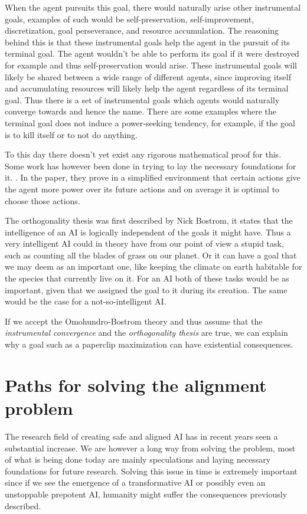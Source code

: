 \documentclass[12pt,A4]{report}
\theoremstyle{definition}
\begin{document}
When the agent pursuits this goal, there would naturally arise other instrumental goals, examples of such would be self-preservation, self-improvement, discretization, goal perseverance, and resource accumulation. The reasoning behind this is that these instrumental goals help the agent in the pursuit of its terminal goal. The agent wouldn't be able to perform its goal if it were destroyed for example and thus self-preservation would arise. These instrumental goals will likely be shared between a wide range of different agents, since improving itself and accumulating resources will likely help the agent regardless of its terminal goal. Thus there is a set of instrumental goals which agents would naturally converge towards and hence the name. There are some examples where the terminal goal does not induce a power-seeking tendency, for example, if the goal is to kill itself or to not do anything. 

To this day there doesn't yet exist any rigorous mathematical proof for this. Some work has however been done in trying to lay the necessary foundations for it. \autocite{TURNER et al}. In the paper, they prove in a simplified environment that certain actions give the agent more power over its future actions and on average it is optimal to choose those actions. 

The orthogonality thesis was first described by Nick Bostrom\cite{Bostrom2}, it states that the intelligence of an AI is logically independent of the goals it might have. Thus a very intelligent AI could in theory have from our point of view a stupid task, such as counting all the blades of grass on our planet. Or it can have a goal that we may deem as an important one, like keeping the climate on earth habitable for the species that currently live on it. For an AI both of these tasks would be as important, given that we assigned the goal to it during its creation. The same would be the case for a not-so-intelligent AI.

If we accept the Omohundro-Bostrom theory and thus assume that the \textit{instrumental convergence} and the \textit{orthogonality thesis} are true, we can explain why a goal such as a paperclip maximization can have existential consequences. 


\section{Paths for solving the alignment problem}
The research field of creating safe and aligned AI has in recent years seen a substantial increase. We are however a long way from solving the problem, most of what is being done today are mainly speculations and laying necessary foundations for future research. Solving this issue in time is extremely important since if we see the emergence of a transformative AI or possibly even an unstoppable prepotent AI, humanity might suffer the consequences previously described. 
\end{document}
